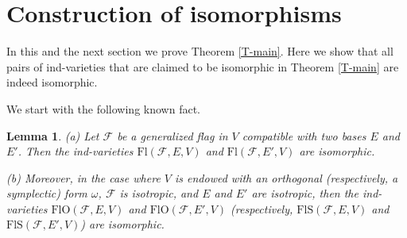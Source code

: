 \documentclass[12pt]{amsart}
\newcommand{\Flags}{\mathrm{Fl}}
\newcommand{\OFlags}{\mathrm{FlO}}
\newcommand{\SFlags}{\mathrm{FlS}}
\newtheorem{lemma}[theorem]{Lemma}
\theoremstyle{definition}
\begin{document}
\section{Construction of isomorphisms}

\label{section-4}

In this and the next section we prove Theorem \ref{T-main}.
Here we show that all pairs of ind-varieties that are claimed to be isomorphic in Theorem \ref{T-main} are indeed isomorphic.

We start with the following known fact.

\begin{lemma}
\label{L4.1}
{\rm (a)} Let $\mathcal{F}$ be a generalized flag in $V$ compatible with two bases $E$ and $E'$. Then the ind-varieties $\Flags(\mathcal{F},E,V)$ and $\Flags(\mathcal{F},E',V)$ are isomorphic.

{\rm (b)} Moreover, in the case where $V$ is endowed with an orthogonal (respectively, a symplectic) form $\omega$, $\mathcal{F}$ is isotropic, and $E$ and $E'$ are isotropic, then the ind-varieties $\OFlags(\mathcal{F},E,V)$ and $\OFlags(\mathcal{F},E',V)$ (respectively, $\SFlags(\mathcal{F},E,V)$ and $\SFlags(\mathcal{F},E',V)$) are isomorphic.
\end{lemma}
\end{document}
